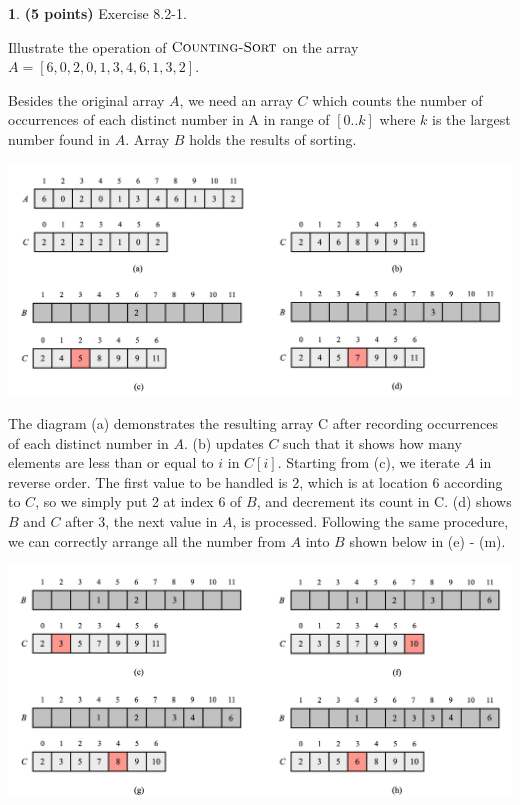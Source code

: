 \documentclass[11pt]{article}
\theoremstyle{definition}
\theoremstyle{theorem}
\newtheorem{prob}{}
\newcommand{\solution}{\medskip\noindent{\color{DarkBlue}\textbf{Solution:}}}
\begin{document}
\newpage
\begin{prob} \textbf{(5 points)} Exercise 8.2-1.
\end{prob}
Illustrate the operation of $\textproc{\textsc{Counting-Sort}}$ on the array $A = [6, 0, 2, 0, 1, 3, 4, 6, 1, 3, 2]$.

\solution

Besides the original array $A$, we need an array $C$ which counts the number of occurrences of each distinct number in A in range of $[0..k]$ where $k$ is the largest number found in $A$. Array $B$ holds the results of sorting.

\includegraphics[scale=0.6]{hw3q3-1.png}

The diagram (a) demonstrates the resulting array C after recording occurrences of each distinct number in $A$. (b) updates $C$ such that it shows how many elements are less than or equal to $i$ in $C[i]$. Starting from (c), we iterate $A$ in reverse order. The first value to be handled is 2, which is at location $6$ according to $C$, so we simply put 2 at index 6 of $B$, and decrement its count in C. (d) shows $B$ and $C$ after 3, the next value in $A$, is processed. Following the same procedure, we can correctly arrange all the number from $A$ into $B$ shown below in (e) - (m).

\includegraphics[scale=0.6]{hw3q3-2.png}
\end{document}

